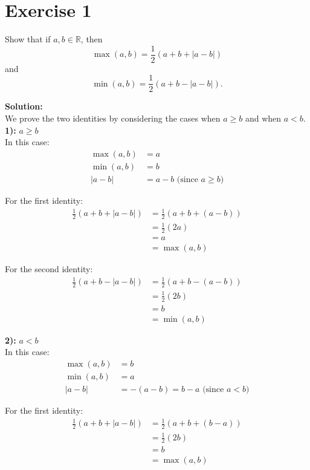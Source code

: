 \documentclass{article}
\begin{document}
\section*{Exercise 1}
Show that if $a, b \in \mathbb{R}$, then
\[\max(a,b) = \frac{1}{2}(a + b + |a-b|)\]
and
\[\min(a,b) = \frac{1}{2}(a + b - |a-b|).\]

\textbf{Solution:} \\

We prove the two identities by considering the cases when $a \geq b$ and when $a < b$. \\

\textbf{1):} $a \geq b$ \\

In this case:
\begin{align*}
\max(a,b) &= a \\
\min(a,b) &= b \\
|a-b| &= a-b \text{ (since $a \geq b$)}
\end{align*}

For the first identity:
\begin{align*}
\frac{1}{2}(a + b + |a-b|) &= \frac{1}{2}(a + b + (a-b)) \\
&= \frac{1}{2}(2a) \\
&= a \\
&= \max(a,b)
\end{align*}

For the second identity:
\begin{align*}
\frac{1}{2}(a + b - |a-b|) &= \frac{1}{2}(a + b - (a-b)) \\
&= \frac{1}{2}(2b) \\
&= b \\
&= \min(a,b)
\end{align*}

\textbf{2):} $a < b$ \\

In this case:
\begin{align*}
\max(a,b) &= b \\
\min(a,b) &= a \\
|a-b| &= -(a-b) = b-a \text{ (since $a < b$)}
\end{align*}

For the first identity:
\begin{align*}
\frac{1}{2}(a + b + |a-b|) &= \frac{1}{2}(a + b + (b-a)) \\
&= \frac{1}{2}(2b) \\
&= b \\
&= \max(a,b)
\end{align*}
\end{document}
